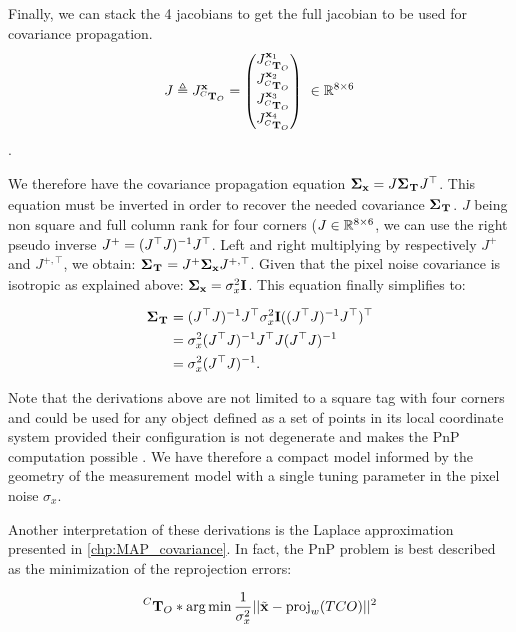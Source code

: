 Finally, we can stack the 4 jacobians to get the full jacobian to be used for covariance propagation.
\begin{equation}
    J \triangleq J^{{\bf x}}_{\prescript{C}{}{{\bf T}}_{O}}=
    \begin{pmatrix}
    J^{{\bf x}_1}_{\prescript{C}{}{{\bf T}}_{O}} \\ J^{{\bf x}_2}_{\prescript{C}{}{{\bf T}}_{O}} \\ J^{{\bf x}_3}_{\prescript{C}{}{{\bf T}}_{O}} \\ J^{{\bf x}_4}_{\prescript{C}{}{{\bf T}}_{O}}
    \end{pmatrix}
    ~ \in \mathbb{R}^{8 \times 6}
\end{equation}.

We therefore have the covariance propagation equation ${\bm \Sigma}_{{\bf x}} = J {\bm \Sigma}_{\prescript{}{}{{\bf T}}_{}} J^{\top}$. 
This equation must be inverted in order to recover the needed covariance ${\bm \Sigma}_{\prescript{}{}{{\bf T}}_{}}$. $J$ being non square and full column rank for four corners ($J \in \mathbb{R}^{8 \times 6}$, 
we can use the right pseudo inverse $J^{+} = (J^{\top} J)^{-1}J^{\top}$. Left and right multiplying by respectively $J^{+}$ and $J^{+,\top}$, we obtain: ${\bm \Sigma}_{\prescript{}{}{{\bf T}}_{}} = J^{+} {\bm \Sigma}_{{\bf x}} J^{+,\top}$. 
Given that the pixel noise covariance is isotropic as explained above:
${\bm \Sigma}_{{\bf x}} = \sigma_x^2 {\bf I}$. This equation finally simplifies to:

\begin{align}
    {\bm \Sigma}_{\prescript{}{}{{\bf T}}_{}} 
    &=  (J^{\top} J)^{-1}J ^{\top} \sigma_x^2 {\bf I} ((J^{\top} J)^{-1}J^{\top})^{\top} \\
    &=  \sigma_x^2 (J^{\top} J)^{-1} J^{\top} J (J^{\top} J)^{-1} \\
    &= \sigma_{x}^2(J^{\top} J)^{-1}.
\end{align}

Note that the derivations above are not limited to a square tag with four corners and could be used for any object defined as
a set of points in its local coordinate system provided their configuration is not degenerate and makes the PnP computation possible \cite{gao2003complete}.  
We have therefore a compact model informed by the geometry of the measurement model with a single tuning parameter in the pixel noise $\sigma_x$.

Another interpretation of these derivations is the Laplace approximation presented in \ref{chp:MAP_covariance}. 
In fact, the PnP problem is best described as the minimization of the reprojection errors:

\begin{equation}
    \prescript{C}{}{{\bf T}}_{O}* \operatorname*{arg\,min} \frac{1}{\sigma_x^2} ||\tilde{{\bf x}} - \text{proj}_{w}(T{C}{O})||^2
\end{equation}

